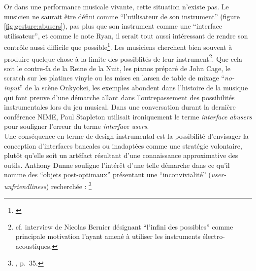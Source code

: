 \indent Or dans une performance musicale vivante, cette situation n'existe pas. Le musicien ne saurait être défini comme ``l'utilisateur de son instrument'' (figure \ref{fig:gesture:abusers}), pas plus que son instrument comme une ``interface utilisateur'', et comme le note Ryan, il serait tout aussi intéressant de rendre son contrôle aussi difficile que possible\footnote{ \cite{ryan_remarks_1991}}. Les musiciens cherchent bien souvent à produire quelque chose à la limite des possiblités de leur instrument\footnote{cf. interview de Nicolas Bernier désignant ``l'infini des possibles'' comme principale motivation l'ayant amené à utiliser les instruments électro-acoustiques.}. Que cela soit le contre-fa de la Reine de la Nuit, les pianos préparé de John Cage, le scratch sur les platines vinyle ou les mises en larsen de table de mixage ``\textit{no-input}'' de la scène Onkyokei, les exemples abondent dans l'histoire de la musique qui font preuve d'une démarche allant dans l'outrepassement des possibilités instrumentales lors du jeu musical. Dans une conversation durant la dernière conférence NIME, Paul Stapleton utilisait ironiquement le terme \textit{interface abusers} pour souligner l'erreur du terme \textit{interface users}.\\
\indent Une conséquence en terme de design instrumental est la possibilité d'envisager la conception d'interfaces bancales ou inadaptées comme une stratégie volontaire, plutôt qu'elle soit un artéfact résultant d'une connaissance approximative des outils. Anthony Dunne souligne l'intérêt d'une telle démarche dans ce qu'il nomme des ``objets post-optimaux'' présentant une ``inconvivialité'' (\textit{user-unfriendliness}) recherchée : \footnote{, \cite{dunne_hertzian_1999} p.~35.}


